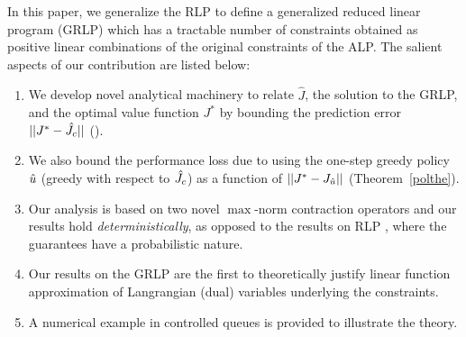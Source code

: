 In this paper, we generalize the RLP to define a generalized reduced linear program (GRLP) which has a tractable number of constraints obtained as positive linear combinations of the original constraints of the ALP. 
The salient aspects of our contribution are listed below:
\begin{enumerate}
		\item We develop novel analytical machinery to relate $\hat{J}$, the solution to the GRLP, and the optimal value function $J^*$ by bounding the prediction error $||J^*-\hat{J}_c||$ (). 
		\item We also bound the performance loss due to using the one-step greedy policy $\hat{u}$ (greedy with respect to $\hat{J}_c$) as a function of $||J^*-J_{\hat{u}}||$ (Theorem~\ref{polthe}).
		\item Our analysis is based on two novel $\max$-norm contraction operators and our results hold \emph{deterministically}, as opposed to the results on RLP \cite{SALP,CS}, where the guarantees have a probabilistic nature.
		\item Our results on the GRLP are the first to theoretically justify linear function approximation of Langrangian (dual) variables underlying the constraints.
		\item A numerical example in controlled queues is provided to illustrate the theory.
\end{enumerate}

